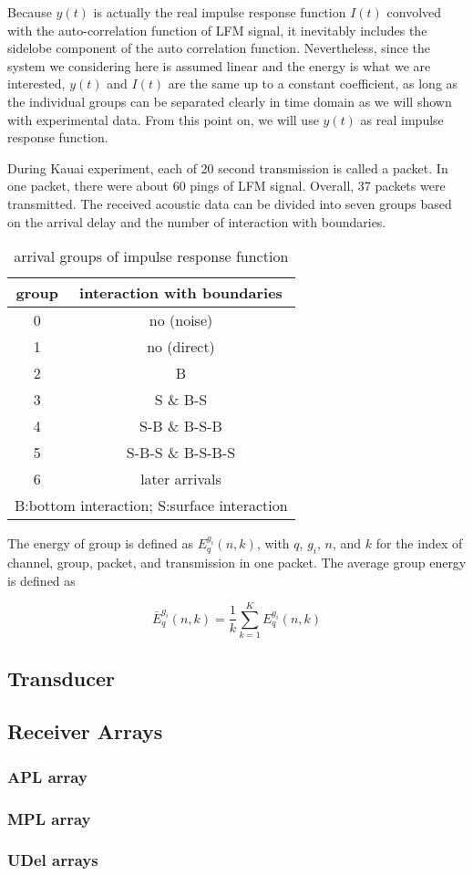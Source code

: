 Because $y(t)$ is actually the real impulse response function $I(t)$
convolved with the auto-correlation function of LFM signal, it
inevitably includes the sidelobe component of the auto correlation
function. Nevertheless, since the system we considering here is
assumed linear and the energy is what we are interested, $y(t)$ and
$I(t)$ are the same up to a constant coefficient, as long as the
individual groups can be separated clearly in time domain as we will
shown with experimental data. From this point on, we will use $y(t)$
as real impulse response function.

During Kauai experiment, each of 20 second transmission is called a
packet. In one packet, there were about 60 pings of LFM signal.
Overall, 37 packets were transmitted. The received acoustic data can
be divided into seven groups based on the arrival delay and the
number of interaction with boundaries.

\begin{table}[h]
\caption{arrival groups of impulse response function}\label{tab-1}
\begin{center}
\begin{tabular}{|c|c|}
\hline
group&interaction  with  boundaries\\
\hline
0&no (noise)\\
\hline
1&no (direct)\\
\hline
2&B\\
\hline
3&S \& B-S\\
\hline
4&S-B \& B-S-B \\
\hline
5&S-B-S \& B-S-B-S\\
\hline
6& later arrivals \\
\hline \multicolumn{2}{|l|}{B:bottom interaction; S:surface
interaction}\\
 \hline

\end{tabular}
\end{center}
\end{table}


The energy of group is defined as $ E_q^{g_i}(n,k)$, with $q$,
$g_i$, $n$, and $k$ for the index of channel, group, packet, and
transmission in one packet. The average group energy is defined as

\begin{equation} \bar E_q^{g_i}(n,k) =\frac{1}{k} \sum _{k=1}^K
E_q^{g_i}(n,k)
\end{equation}

\subsection{Transducer}
\subsection{Receiver Arrays}
\subsubsection{APL array}
\subsubsection{MPL array}
\subsubsection{UDel arrays}
